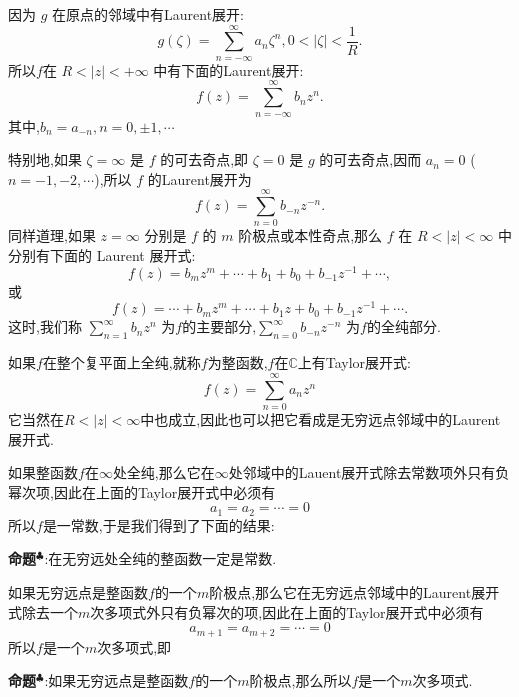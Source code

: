 因为 $g$ 在原点的邻域中有Laurent展开:
$$
g(\zeta) = \sum_{n=-\infty}^{\infty} a_n \zeta^n, 0 < |\zeta| < \frac{1}{R}.
$$
所以$f$在 $R < |z| < +\infty$ 中有下面的Laurent展开:
$$
f(z) = \sum_{n=-\infty}^{\infty} b_n z^n.
$$
其中,$b_n = a_{-n}, n = 0, \pm 1, \cdots$\par
特别地,如果 $\zeta = \infty$ 是 $f$ 的可去奇点,即 $\zeta = 0$ 是 $g$ 的可去奇点,因而 $a_n = 0$ ($n = -1, -2, \cdots$),所以 $f$ 的Laurent展开为
$$
f(z) = \sum_{n=0}^{\infty} b_{-n} z^{-n}.
$$
\qquad 同样道理,如果 $z=\infty$ 分别是 $f$ 的 $m$ 阶极点或本性奇点,那么 $f$ 在 $R<|z|<\infty$ 中分别有下面的 Laurent 展开式:
$$
f(z)=b_{m}z^{m}+\cdots+b_{1}+b_{0}+b_{-1}z^{-1}+\cdots,
$$
或
$$
f(z)=\cdots+b_{m}z^{m}+\cdots+b_{1}z+b_{0}+b_{-1}z^{-1}+\cdots.$$
这时,我们称 $\sum_{n=1}^{\infty}b_n z^n$ 为$f$的主要部分,$\sum_{n=0}^{\infty}b_{-n}z^{-n}$ 为$f$的全纯部分.\par
如果$f$在整个复平面上全纯,就称$f$为整函数,$f$在$\mathbb{C}$上有Taylor展开式:
$$
f(z)=\sum_{n=0}^{\infty}a_n z^n
$$
它当然在$R<|z|<\infty$中也成立,因此也可以把它看成是无穷远点邻域中的Laurent展开式.\par
如果整函数$f$在$\infty$处全纯,那么它在$\infty$处邻域中的Lauent展开式除去常数项外只有负幂次项,因此在上面的Taylor展开式中必须有
$$
a_1=a_2=\cdots=0
$$
所以$f$是一常数,于是我们得到了下面的结果:\par
\textbf{命题}$^\clubsuit$:在无穷远处全纯的整函数一定是常数.\par
如果无穷远点是整函数$f$的一个$m$阶极点,那么它在无穷远点邻域中的Laurent展开式除去一个$m$次多项式外只有负幂次的项,因此在上面的Taylor展开式中必须有
$$
a_{m+1}=a_{m+2}=\cdots=0
$$
所以$f$是一个$m$次多项式,即\par
\textbf{命题}$^\clubsuit$:如果无穷远点是整函数$f$的一个$m$阶极点,那么所以$f$是一个$m$次多项式.
